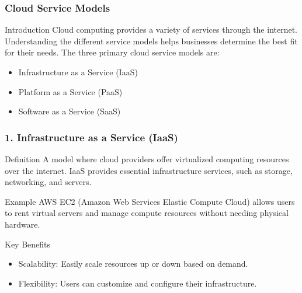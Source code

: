 \documentclass[aspectratio=169]{beamer}
\begin{document}
\begin{frame}[fragile]
    \frametitle{Cloud Service Models}
    
    \begin{block}{Introduction}
        Cloud computing provides a variety of services through the internet. Understanding the different service models helps businesses determine the best fit for their needs. The three primary cloud service models are:
    \end{block}
    
    \begin{itemize}
        \item Infrastructure as a Service (IaaS)
        \item Platform as a Service (PaaS)
        \item Software as a Service (SaaS)
    \end{itemize}
\end{frame}

\begin{frame}[fragile]
    \frametitle{1. Infrastructure as a Service (IaaS)}
    
    \begin{block}{Definition}
        A model where cloud providers offer virtualized computing resources over the internet. IaaS provides essential infrastructure services, such as storage, networking, and servers.
    \end{block}
    
    \begin{block}{Example}
        AWS EC2 (Amazon Web Services Elastic Compute Cloud) allows users to rent virtual servers and manage compute resources without needing physical hardware.
    \end{block}
    
    \begin{block}{Key Benefits}
        \begin{itemize}
            \item Scalability: Easily scale resources up or down based on demand.
            \item Flexibility: Users can customize and configure their infrastructure.
        \end{itemize}
    \end{block}
\end{frame}
\end{document}
